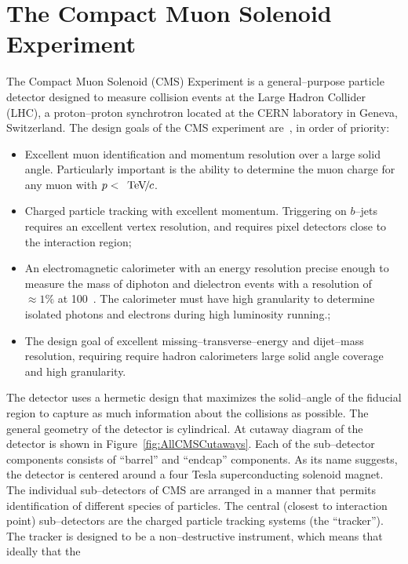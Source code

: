 \ifx\master\undefined\fi
\chapter{The Compact Muon Solenoid Experiment}
\label{ch:detector}
%
%
The Compact Muon Solenoid (CMS) Experiment is a general--purpose particle
detector designed to measure collision events at the Large Hadron Collider
(LHC), a proton--proton synchrotron located at the CERN laboratory in Geneva,
Switzerland.  The design goals of the CMS experiment are~\cite{CMSExperiment},
in order of priority:
\begin{itemize}
  \item  Excellent muon identification and momentum resolution over a large
    solid angle.  Particularly important is the ability to determine the muon
    charge for any muon with $p <~{\,\text{Te\hspace{-.08em}V\hspace{-0.16em}/\hspace{-0.08em}}c}$.
  \item Charged particle tracking with excellent momentum.
     Triggering on $b$--jets requires an excellent vertex resolution, and
     requires pixel detectors close to the interaction region;
  \item An electromagnetic calorimeter with an energy resolution precise enough
    to measure the mass of diphoton and dielectron events with a resolution of
    $\approx 1\%$ at 100~\GeVcc.  The calorimeter must have high granularity to
    determine isolated photons and electrons during high luminosity running.;
  \item The design goal of excellent missing--transverse--energy and dijet--mass 
    resolution, requiring require hadron calorimeters large solid angle coverage
    and high granularity.
\end{itemize}
The detector uses a hermetic design that maximizes the
solid--angle of the fiducial region to capture as much information about the
collisions as possible.  The general geometry of the detector is cylindrical.
At cutaway diagram of the detector is shown in Figure~\ref{fig:AllCMSCutaways}.
Each of the sub--detector components consists of ``barrel'' and ``endcap''
components.  As its name suggests, the detector is centered around a four Tesla
superconducting solenoid magnet.  The individual sub--detectors of CMS are
arranged in a manner that permits identification of different species of
particles.  The central (closest to interaction point) sub--detectors are the
charged particle tracking systems (the ``tracker'').  The tracker is designed to
be a non--destructive instrument, which means that ideally that the
